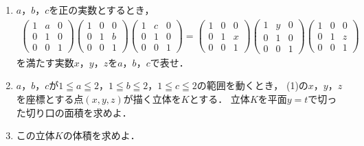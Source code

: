 \documentclass[../../main.tex]{subfiles}
\begin{document}
\begin{enumerate}
  \item $a$，$b$，$c$を正の実数とするとき，
    \begin{align*}
      \begin{pmatrix} 1 & a & 0 \\ 0 & 1 & 0 \\ 0 & 0 & 1
      \end{pmatrix}
      \begin{pmatrix} 1 & 0 & 0 \\ 0 & 1 & b \\ 0 & 0 & 1
      \end{pmatrix}
      \begin{pmatrix} 1 & c & 0 \\ 0 & 1 & 0 \\ 0 & 0 & 1
      \end{pmatrix}
      =
      \begin{pmatrix} 1 & 0 & 0 \\ 0 & 1 & x \\ 0 & 0 & 1
      \end{pmatrix}
      \begin{pmatrix} 1 & y & 0 \\ 0 & 1 & 0 \\ 0 & 0 & 1
      \end{pmatrix}
      \begin{pmatrix} 1 & 0 & 0 \\ 0 & 1 & z \\ 0 & 0 & 1
      \end{pmatrix}
    \end{align*}
    を満たす実数$x$，$y$，$z$を$a$，$b$，$c$で表せ．
  \item $a$，$b$，$c$が$1 \leqq a \leqq 2$，$1 \leqq b \leqq 2$，$1 \leqq c \leqq 2$の範囲を動くとき，
    (1)の$x$，$y$，$z$を座標とする点$(x,y,z)$が描く立体を$K$とする．
    立体$K$を平面$y=t$で切った切り口の面積を求めよ．
  \item この立体$K$の体積を求めよ．
\end{enumerate}
\end{document}

